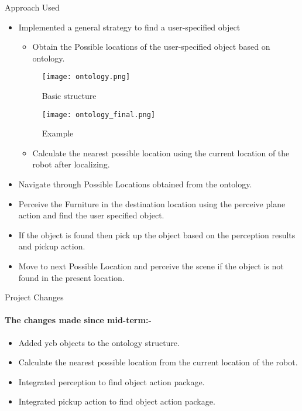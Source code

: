 \documentclass[aspectratio=169]{beamer}
\begin{document}
\begin{frame}{Approach Used}
    \begin{itemize}
    \item Implemented a general strategy to find a user-specified object
        \begin{itemize}
            \item Obtain the Possible locations of the user-specified object based on ontology.
        \end{itemize}
        \begin{multicols}{2}
        \begin{figure}
            \centering
            \texttt{[image: ontology.png]}
            \caption{Basic structure}
            \label{fig:my_label}
        \end{figure}
        \begin{figure}
            \centering
            \texttt{[image: ontology\_final.png]}
            \caption{Example}
            \label{fig:my_label}
        \end{figure}
        \end{multicols}
        \begin{itemize}
            \item Calculate the nearest possible location using the current location of the robot after localizing.
        \end{itemize}
    \end{itemize} 
    \vfill
\end{frame}
\begin{frame}{}
    \begin{itemize}
        \item Navigate through Possible Locations obtained from the ontology.
        \item Perceive the Furniture in the destination location using the perceive plane action and find the user specified object.
        \item If the object is found then pick up the object based on the perception results and pickup action.
        \item Move to next Possible Location and perceive the scene if the object is not found in the present location.
    \end{itemize}
\end{frame}

\begin{frame}{Project Changes}
 \framesubtitle{The changes made since mid-term:-}%
\begin{itemize}
    \item Added ycb objects to the ontology structure.
    \item Calculate the nearest possible location from the current location of the robot.
    \item Integrated perception to find object action package.
    \item Integrated pickup action to find object action package.
\end{itemize}
\end{frame}
\end{document}
